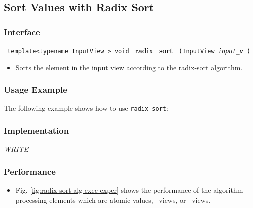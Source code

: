
\subsection{Sort Values with Radix Sort} \label{sec-sort-radix}

\subsubsection{Interface} %

\noindent
\texttt{%
template<typename InputView >
\newline
void 
}
\newline
\textbf{radix\_sort}%
\texttt{%
(InputView 
\textit{input\_v}%
)
}

\begin{itemize}
\item
Sorts the element in the input view according to the radix-sort algorithm. 
\end{itemize}

\subsubsection{Usage Example} %

The following example shows how to use \texttt{radix\_sort}:

 
\subsubsection{Implementation} %

\textit{WRITE}

\subsubsection{Performance} %

\begin{itemize}
\item
Fig. \ref{fig:radix-sort-alg-exec-exper}
shows the performance of the algorithm processing
elements which are atomic values, \stl\ views, or \stapl\ views.
\end{itemize}

